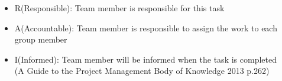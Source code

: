 \begin{itemize}
\item R(Responsible): Team member is responsible for this task
\item A(Accountable): Team member is responsible to assign the work to each group member
\item I(Informed): Team member will be informed when the task is completed\\
(A Guide to the Project Management Body of Knowledge 2013 p.262)
\end{itemize}